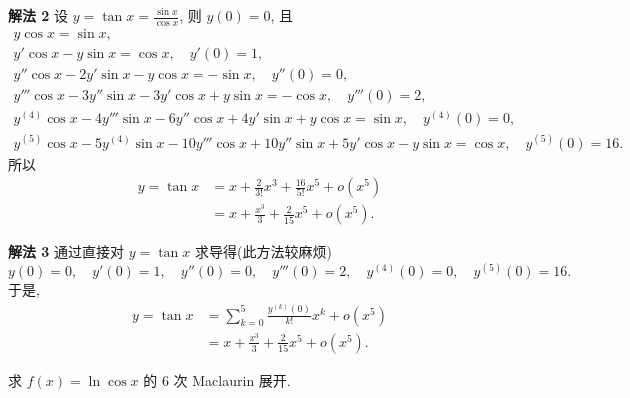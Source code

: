\begin{solution}
\textbf{解法 2} 设 $y=\tan x=\frac{\sin x}{\cos x}$, 则 $y(0)=0$, 且
\begin{gather*}
y\cos x=\sin x,\\
y'\cos x-y\sin x=\cos x,\quad y'(0)=1,\\
y''\cos x-2y'\sin x-y\cos x=-\sin x,\quad y''(0)=0,\\
y'''\cos x-3y''\sin x-3y'\cos x+y\sin x=-\cos x,\quad y'''(0)=2,\\
y^{(4)}\cos x-4y'''\sin x-6y''\cos x+4y'\sin x+y\cos x=\sin x,\quad y^{(4)}(0)=0,\\
y^{(5)}\cos x-5y^{(4)}\sin x-10y'''\cos x+10y''\sin x+5y'\cos x-y\sin x=\cos x,\quad y^{(5)}(0)=16.
\end{gather*}
所以
\begin{align*}
y=\tan x&=x+\frac{2}{3!}x^{3}+\frac{16}{5!}x^{5}+o(x^{5})\\
&=x+\frac{x^{3}}{3}+\frac{2}{15}x^{5}+o(x^{5}).
\end{align*}

\textbf{解法 3} 通过直接对 $y=\tan x$ 求导得(此方法较麻烦)
\[
y(0)=0,\quad y'(0)=1,\quad y''(0)=0,\quad y'''(0)=2,\quad y^{(4)}(0)=0,\quad y^{(5)}(0)=16.
\]
于是,
\begin{align*}
y=\tan x&=\sum_{k=0}^{5}\frac{y^{(k)}(0)}{k!}x^{k}+o(x^{5})\\
&=x+\frac{x^{3}}{3}+\frac{2}{15}x^{5}+o(x^{5}).
\end{align*}
\end{solution}

\begin{example}\label{ex:4.1.10}
求 $f(x)=\ln\cos x$ 的 $6$ 次 Maclaurin 展开.
\end{example}


